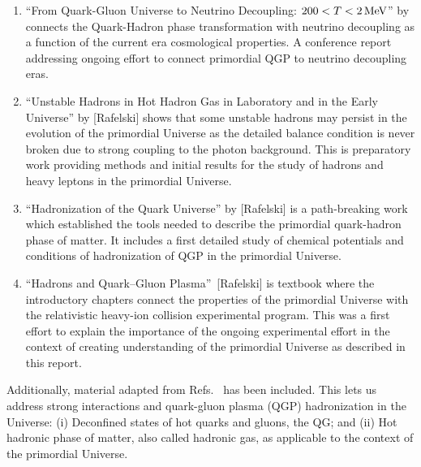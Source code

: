 \begin{enumerate}
%
\item ``From Quark-Gluon Universe to Neutrino Decoupling: $200 < T < 2\text{\,MeV}$'' by  {\color{black} connects the Quark-Hadron phase transformation with neutrino decoupling as a function of the current era cosmological properties. A conference report addressing ongoing effort to connect primordial QGP to neutrino decoupling eras.}
%
\item ``Unstable Hadrons in Hot Hadron Gas in Laboratory and in the Early Universe'' by [Rafelski] shows that some unstable hadrons may persist in the evolution of the primordial Universe as the detailed balance condition is never broken due to strong coupling to the photon background. {\color{black} This is preparatory work providing methods and initial results for the study of hadrons and heavy leptons in the primordial Universe.}
%
\item ``Hadronization of the Quark Universe'' by [Rafelski] is {\color{black} a path-breaking work which established the tools needed to describe the primordial quark-hadron phase of matter.} It includes a first detailed study of chemical potentials and conditions of hadronization of QGP in the primordial Universe. 
%
\item {\color{black}``Hadrons and Quark–Gluon Plasma''~[Rafelski] is textbook where the introductory chapters connect the properties of the primordial Universe with the relativistic heavy-ion collision experimental program. This was a first effort to explain the importance of the ongoing experimental effort in the context of creating understanding of the primordial Universe as described in this report.}
\end{enumerate}
Additionally, material adapted from Refs.~\cite{Rafelski:2019twp,Rafelski:2016hnq,Rafelski:2015cxa} has been included. This lets us address strong interactions and quark-gluon plasma (QGP) hadronization in the Universe: (i) Deconfined states of hot quarks and gluons, the QG; and (ii) Hot hadronic phase of matter, also called hadronic gas, as applicable to the context of the primordial Universe. 
